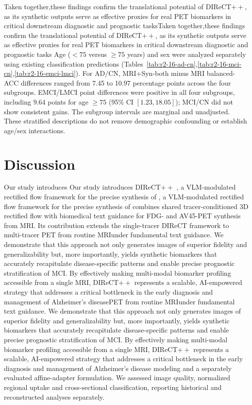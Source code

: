 \documentclass{article}
\providecommand{\DIFaddtex}[1]{{\protect\color{blue} \sf #1}} %
\providecommand{\DIFdeltex}[1]{{\protect\color{red} \ifmmode #1\else\scriptsize #1\fi}} %
\providecommand{\DIFaddbegin}{} %
\providecommand{\DIFaddend}{} %
\providecommand{\DIFdelbegin}{} %
\providecommand{\DIFdelend}{} %
\providecommand{\DIFadd}[1]{\texorpdfstring{\DIFaddtex{#1}}{#1}} %
\providecommand{\DIFdel}[1]{\texorpdfstring{\DIFdeltex{#1}}{}} %
\newcommand{\DIFscaledelfig}{0.5}
\newlength{\DIFdelgraphicswidth} %
\newlength{\DIFdelgraphicsheight} %
\newcommand{\DIFaddincludegraphics}[2][]{{\color{blue}\fbox{\DIFOincludegraphics[#1]{#2}}}} %
\newcommand{\DIFdelincludegraphics}[2][]{%
\sbox{\DIFdelgraphicsbox}{\DIFOincludegraphics[#1]{#2}}%
\settoboxwidth{\DIFdelgraphicswidth}{\DIFdelgraphicsbox} %
\settoboxtotalheight{\DIFdelgraphicsheight}{\DIFdelgraphicsbox} %
\scalebox{\DIFscaledelfig}{%
\parbox[b]{\DIFdelgraphicswidth}{\usebox{\DIFdelgraphicsbox}\\[-\baselineskip] \rule{\DIFdelgraphicswidth}{0em}}\llap{\resizebox{\DIFdelgraphicswidth}{\DIFdelgraphicsheight}{%
\setlength{\unitlength}{\DIFdelgraphicswidth}%
\begin{picture}(1,1)%
\thicklines\linethickness{2pt} %
{\color[rgb]{1,0,0}\put(0,0){\framebox(1,1){}}}%
{\color[rgb]{1,0,0}\put(0,0){\line( 1,1){1}}}%
{\color[rgb]{1,0,0}\put(0,1){\line(1,-1){1}}}%
\end{picture}%
}\hspace*{3pt}}} %
} %
\DeclareRobustCommand{\DIFaddbegin}{\DIFOaddbegin \let\includegraphics\DIFaddincludegraphics} %
\DeclareRobustCommand{\DIFaddend}{\DIFOaddend \let\includegraphics\DIFOincludegraphics} %
\DeclareRobustCommand{\DIFdelbegin}{\DIFOdelbegin \let\includegraphics\DIFdelincludegraphics} %
\DeclareRobustCommand{\DIFdelend}{\DIFOaddend \let\includegraphics\DIFOincludegraphics} %
\begin{document}
\DIFdel{Taken together,these findings confirm the translational potential of DIReCT$++$, as its synthetic outputs serve as effective proxies for real PET biomarkers in critical downstream diagnostic and prognostic tasks}\DIFdelend \DIFaddbegin \DIFadd{Age ($<75$ versus $\geq75$ years) and sex were analyzed separately using existing classification predictions (Tables~\ref{tab:r2-16-ad-cn},\ref{tab:r2-16-mci-cn},\ref{tab:r2-16-emci-lmci}). For AD/CN, MRI+Syn-both minus MRI balanced-ACC differences ranged from 7.45 to 10.97 percentage points across the four subgroups. EMCI/LMCI point differences were positive in all four subgroups, including 9.64 points for age $\geq75$ (95\% CI $[1.23,18.05]$); MCI/CN did not show consistent gains. The subgroup intervals are marginal and unadjusted. These stratified descriptions do not remove demographic confounding or establish age/sex interactions}\DIFaddend .



\section{Discussion}
\DIFdelbegin \DIFdel{Our study introduces }\DIFdelend DIReCT$++$ \DIFdelbegin \DIFdel{, a VLM-modulated rectified flow framework for the precise synthesis of }\DIFdelend \DIFaddbegin \DIFadd{combines shared tracer-conditioned 3D rectified flow with biomedical text guidance for FDG- and AV45-PET synthesis from MRI. Its contribution extends the single-tracer DIReCT framework to }\DIFaddend multi-tracer \DIFdelbegin \DIFdel{PET from routine MRIunder fundamental text guidance. We demonstrate that this approach not only generates images of superior fidelity and generalizability but, more importantly, yields synthetic biomarkers that accurately recapitulate disease-specific patterns and enable precise prognostic stratification of MCI. By effectively making multi-modal biomarker profiling accessible from a single MRI, DIReCT$++$ represents a scalable, AI-empowered strategy that addresses a critical bottleneck in the early diagnosis and management of Alzheimer's disease}\DIFdelend \DIFaddbegin \DIFadd{modeling and a separately evaluated affine-adapter formulation. We assessed image quality, normalized regional uptake and cross-sectional classification, reporting historical and reconstructed analyses separately}\DIFaddend .
\end{document}

